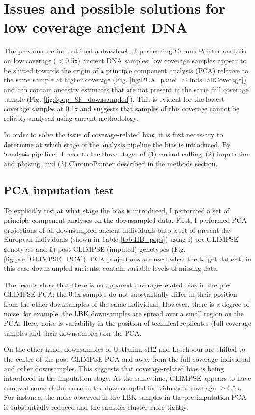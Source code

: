 {\section{Issues and possible solutions for low coverage ancient DNA}

The previous section outlined a drawback of performing ChromoPainter analysis on low coverage ($<$0.5x) ancient DNA samples; low coverage samples appear to be shifted towards the origin of a principle component analysis (PCA) relative to the same sample at higher coverage (Fig. \ref{fig:PCA_panel_allInds_allCoverage}) and can contain ancestry estimates that are not present in the same full coverage sample (Fig. \ref{fig:3pop_SF_downsampled}).  This is evident for the lowest coverage samples at 0.1x and suggests that samples of this coverage cannot be reliably analysed using         current methodology.

In order to solve the issue of coverage-related bias, it is first necessary to determine at which stage of the analysis pipeline the bias is introduced. By `analysis pipeline', I refer to the three stages of (1) variant calling, (2) imputation and phasing, and (3) ChromoPainter described in the methods section.

\subsection{PCA imputation test} \label{sec:PCAImputationTest}

To explicitly test at what stage the bias is introduced, I performed a set of principle component analyses on the downsampled data. First, I performed PCA projections of all downsampled ancient individuals onto a set of present-day European individuals (shown in Table \ref{tab:HB_pops}) using i) pre-GLIMPSE genotypes and ii) post-GLIMPSE (imputed) genotypes (Fig. \ref{fig:pre_GLIMPSE_PCA}). PCA projections are used when the target dataset, in this case downsampled ancients, contain variable levels of missing data.  

The results show that there is no apparent coverage-related bias in the pre-GLIMPSE PCA; the 0.1x samples do not substantially differ in their position from the other downsamples of the same individual. However, there is a degree of noise; for example, the LBK downsamples are spread over a small region on the PCA. Here, noise is variability in the position of technical replicates (full coverage samples and their downsamples) on the PCA. 

On the other hand, downsamples of UstIshim, sf12 and Loschbour are shifted to the centre of the post-GLIMPSE PCA and away from the full coverage individual and other downsamples. This suggests that coverage-related bias is being introduced in the imputation stage. At the same time, GLIMPSE appears to have removed some of the noise in the downsampled individuals of coverage $\geq$0.5x. For instance, the noise observed in the LBK samples in the pre-imputation PCA is substantially reduced and the samples cluster more tightly.  

}
